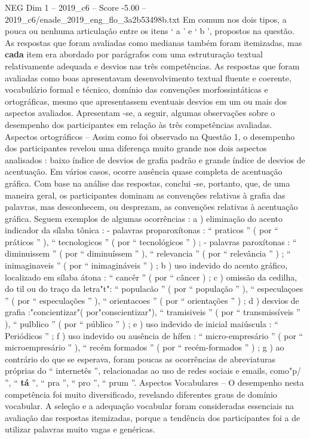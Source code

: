 \begin{textsample}{NEG Dim 1 – 2019\_c6 – Score -5.00 – 2019\_c6/enade\_2019\_eng\_flo\_3a2b53498b.txt}
Em comum nos dois tipos, a pouca ou nenhuma articulação entre os itens ‘ a ’ e ‘ b ’, propostos na questão.
As respostas que foram avaliadas como medianas também foram itemizadas, mas \textbf{cada} item era abordado por parágrafos com uma estruturação textual relativamente adequada e desvios nas três competências.
As respostas que foram avaliadas como boas apresentavam desenvolvimento textual fluente e coerente, vocabulário formal e técnico, domínio das convenções morfossintáticas e ortográficas, mesmo que apresentassem eventuais desvios em um ou mais dos aspectos avaliados.
Apresentam -se, a seguir, algumas observações sobre o desempenho dos participantes em relação às três competências avaliadas.
Aspectos ortográficos – Assim como foi observado na Questão 1, o desempenho dos participantes revelou uma diferença muito grande nos dois aspectos analisados : baixo índice de desvios de grafia padrão e grande índice de desvios de acentuação.
Em vários casos, ocorre ausência quase completa de acentuação gráfica.
Com base na análise das respostas, conclui -se, portanto, que, de uma maneira geral, os participantes dominam as convenções relativas à grafia das palavras, mas desconhecem, ou desprezam, as convenções relativas à acentuação gráfica.
Seguem exemplos de algumas ocorrências : a ) eliminação do acento indicador da sílaba tônica : - palavras proparoxítonas : “ praticos ” ( por “ práticos ” ), “ tecnologicos ” ( por “ tecnológicos ” ) ; - palavras paroxítonas : “ diminuissem ” ( por “ diminuíssem ” ), “ relevancia ” ( por “ relevância ” ) ; “ inimaginaveis ” ( por “ inimagináveis ” ) ; b ) uso indevido do acento gráfico, localizado em sílaba átona : “ cancêr ” ( por “ câncer ) ; c ) omissão da cedilha, do til ou do traço da letra"t": “ populacão ” ( por “ população ” ), “ especulaçoes ” ( por “ especulações ” ), “ orientacoes ” ( por “ orientações ” ) ; d ) desvios de grafia :"concientizar"( por"conscientizar"), “ tramisiveis ” ( por “ transmissíveis ” ), “ pulblico ” ( por “ público ” ) ; e ) uso indevido de inicial maiúscula : “ Periódicos ” ; f ) uso indevido ou ausência de hífen : “ micro-empresário ” ( por “ microempresário ” ), “ recém formados ” ( por “ recém-formados ” ) ; g ) ao contrário do que se esperava, foram poucas as ocorrências de abreviaturas próprias do “ internetês ”, relacionadas ao uso de redes sociais e emails, como"p/ ”, “ \textbf{tá} ”, “ pra ”, “ pro ”, “ prum ”.
Aspectos Vocabulares – O desempenho nesta competência foi muito diversificado, revelando diferentes graus de domínio vocabular.
A seleção e a adequação vocabular foram consideradas essenciais na avaliação das respostas itemizadas, porque a tendência dos participantes foi a de utilizar palavras muito vagas e genéricas.

\end{textsample}

